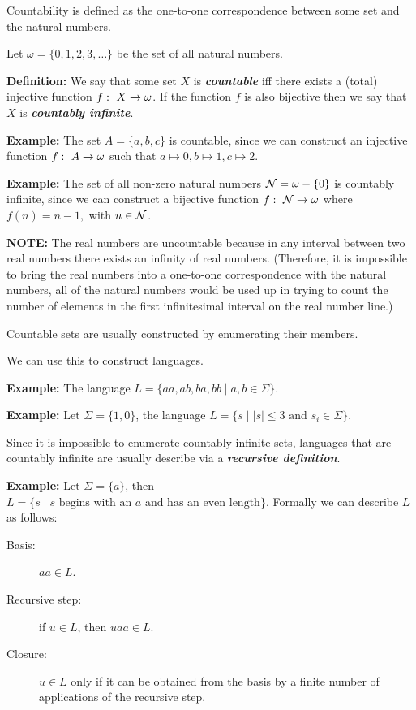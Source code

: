 \documentclass[a4paper,blends,pdf,colorBG,slideColor]{prosper}
\begin{document}
Countability is defined as the one-to-one correspondence between some set and the natural numbers.

Let $\omega = \{0,1,2,3,\ldots\}$ be the set of all natural numbers.


{\bf Definition:} We say that some set $X$ is {\bf\em countable} iff there exists a (total) injective function
$f\,\colon\; X \rightarrow \omega$.  If the function $f$ is also bijective then we say that $X$ is {\bf\em countably infinite}.

{\bf Example:} The set $A= \{a,b,c\}$ is countable, since we can construct an injective function $f\,\colon\; A \rightarrow \omega$ such that $a\mapsto 0, b\mapsto 1, c\mapsto 2$.

{\bf Example:}  The set of all non-zero natural numbers ${\cal N} = \omega - \{0\}$ is countably infinite, since we can construct a bijective function $f\,\colon\; {\cal N} \rightarrow \omega$ where
$
f(n) = n - 1,
$
with $n \in \cal N$.

\vspace{.2in}

{\bf NOTE:} The real numbers are uncountable because in any interval between two real numbers there exists an infinity of real numbers.  (Therefore, it is impossible to bring the real numbers into
a one-to-one correspondence with the natural numbers, all of the natural numbers would be used up in trying to count the number of elements in the first infinitesimal interval on the real number line.)
\es

Countable sets are usually constructed by enumerating their members. 

We can use this to construct languages.

{\bf Example:} The language $L=\{aa,ab,ba,bb \mid a,b \in \Sigma\}$.

{\bf Example:} Let $\Sigma = \{1, 0\}$, the language $L = \{ s \mid |s| \le 3 \mbox{ and } s_i \in \Sigma\}$. 
\es

Since it is impossible to enumerate countably infinite sets, languages that are countably infinite
are usually describe via a {\bf\em recursive definition}.

{\bf Example:} Let $\Sigma = \{a\}$, 
then $
L = \{ s \mid \mbox{$s$ begins with an $a$ and has an even length}\}.
$
Formally we can describe $L$ as follows:
\begin{description}
\item[Basis:] $aa \in L$.
\item[Recursive step:] if $u\in L$, then $uaa \in L$.
\item[Closure:] $u \in L$ only if it can be obtained from the basis by a finite number of applications
of the recursive step. 
\end{description}
\end{document}
